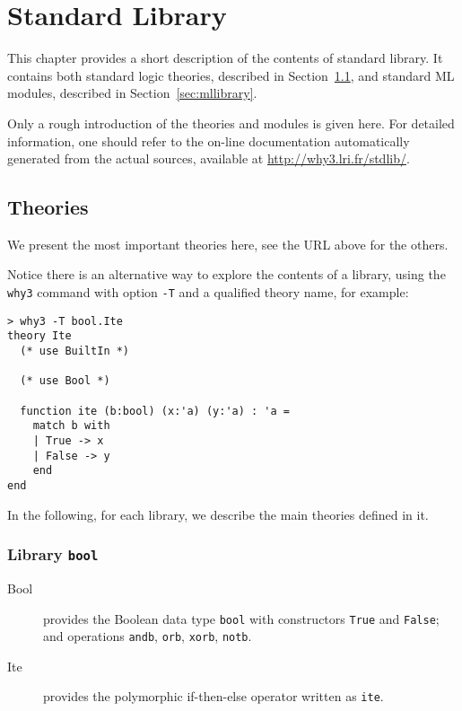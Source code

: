 \chapter{Standard Library}
\label{chap:library}

This chapter provides a short description of the contents of \why
standard library. It contains both standard logic theories, described
in Section~\ref{sec:stdlib}, and standard ML modules, described in
Section~\ref{sec:mllibrary}.

Only a rough introduction of the theories and modules is given
here. For detailed information, one should refer to the on-line
documentation automatically generated from the actual sources,
available at \url{http://why3.lri.fr/stdlib/}.


\section{Theories}
\label{sec:stdlib}

We present the most important theories here, see the URL above for the
others.

Notice there is an alternative way to explore the contents of a
library, using the \verb|why3| command with option 
\verb|-T| and a qualified theory name, for example:

\begin{verbatim}
> why3 -T bool.Ite
theory Ite
  (* use BuiltIn *)

  (* use Bool *)

  function ite (b:bool) (x:'a) (y:'a) : 'a =
    match b with
    | True -> x
    | False -> y
    end
end
\end{verbatim}

In the following, for each library, we describe the main theories
defined in it.

\subsection{Library \texttt{bool}}

\begin{description}

\item[Bool] provides the Boolean data type \verb|bool| with
  constructors \verb|True| and \verb|False|; and operations \verb|andb|, \verb|orb|, \verb|xorb|, \verb|notb|.

\item[Ite] provides the polymorphic if-then-else operator written as \verb|ite|.

\end{description}

